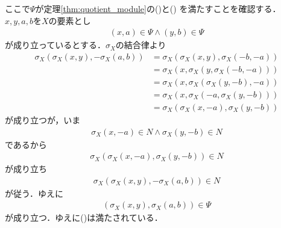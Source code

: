 	ここで$\Psi$が定理\ref{thm:quotient_module}の()と()
	を満たすことを確認する．
	$x,y,a,b$を$X$の要素とし
	\begin{align}
		(x,a) \in \Psi \wedge (y,b) \in \Psi
	\end{align}
	が成り立っているとする．$\sigma_X$の結合律より
	\begin{align}
		\sigma_X\left(\sigma_X(x,y),-\sigma_X(a,b)\right)
		&= \sigma_X\left(\sigma_X(x,y),\sigma_X(-b,-a)\right) \\
		&= \sigma_X\left(x,\sigma_X\left(y,\sigma_X(-b,-a)\right)\right) \\
		&= \sigma_X\left(x,\sigma_X\left(\sigma_X(y,-b),-a\right)\right) \\
		&= \sigma_X\left(x,\sigma_X\left(-a,\sigma_X(y,-b)\right)\right) \\
		&= \sigma_X\left(\sigma_X(x,-a),\sigma_X(y,-b)\right)
	\end{align}
	が成り立つが，いま
	\begin{align}
		\sigma_X(x,-a) \in N \wedge \sigma_X(y,-b) \in N
	\end{align}
	であるから
	\begin{align}
		\sigma_X\left(\sigma_X(x,-a),\sigma_X(y,-b)\right) \in N
	\end{align}
	が成り立ち
	\begin{align}
		\sigma_X\left(\sigma_X(x,y),-\sigma_X(a,b)\right) \in N
	\end{align}
	が従う．ゆえに
	\begin{align}
		\left(\sigma_X(x,y),\sigma_X(a,b)\right) \in \Psi
	\end{align}
	が成り立つ．ゆえに()は満たされている．
	
